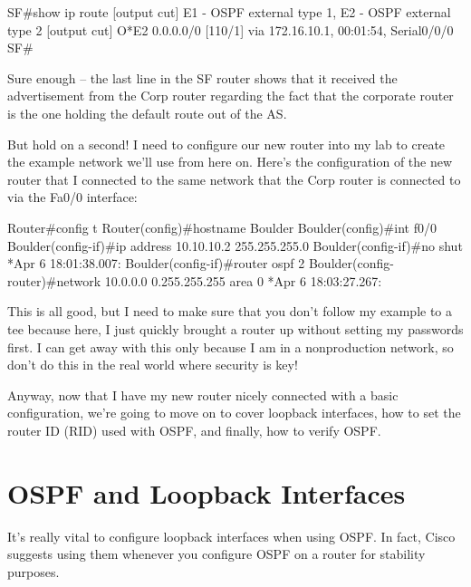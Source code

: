 \begin{cli}
SF#show ip route
[output cut]
E1 - OSPF external type 1, E2 - OSPF external type 2
[output cut]
O*E2 0.0.0.0/0 [110/1] via 172.16.10.1, 00:01:54, Serial0/0/0
SF#
\end{cli}

Sure enough -- the last line in the SF router shows that it received the
advertisement from the Corp router regarding the fact that the corporate
router is the one holding the default route out of the AS.

But hold on a second! I need to configure our new router into my lab to
create the example network we'll use from here on. Here's the
configuration of the new router that I connected to the same network
that the Corp router is connected to via the Fa0/0 interface:

\begin{cli}
Router#config t
Router(config)#hostname Boulder
Boulder(config)#int f0/0
Boulder(config-if)#ip address 10.10.10.2 255.255.255.0
Boulder(config-if)#no shut
*Apr  6 18:01:38.007: %
Boulder(config-if)#router ospf 2
Boulder(config-router)#network 10.0.0.0 0.255.255.255 area 0
*Apr  6 18:03:27.267: %
\end{cli}

This is all good, but I need to make sure that you don't follow my
example to a tee because here, I just quickly brought a router up
without setting my passwords first. I can
\protect\hypertarget{c18.xhtmlux5cux23Page_762}{}{}get away with this
only because I am in a nonproduction network, so don't do this in the
real world where security is key!

Anyway, now that I have my new router nicely connected with a basic
configuration, we're going to move on to cover loopback interfaces, how
to set the router ID (RID) used with OSPF, and finally, how to verify
OSPF.



\section{OSPF and Loopback Interfaces}

It's really vital to configure loopback interfaces when using OSPF. In
fact, Cisco suggests using them whenever you configure OSPF on a router
for stability purposes.

